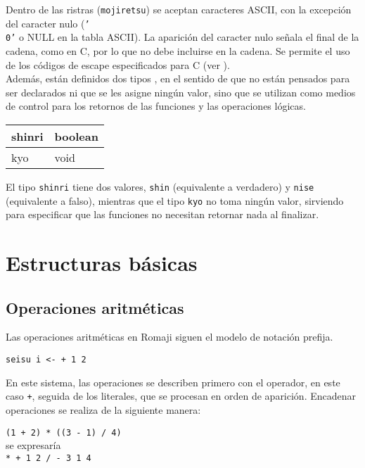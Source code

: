 \documentclass[spanish]{article}
\begin{document}
Dentro de las ristras (\texttt{mojiretsu}) se aceptan caracteres ASCII, con la excepción del caracter nulo (\texttt{'\\0'} o NULL en la tabla ASCII). La aparición del caracter nulo señala el final de la cadena, como en C, por lo que no debe incluirse en la cadena. Se permite el uso de los códigos de escape especificados para C (ver \color{black}).\\

Además, están definidos dos tipos , en el sentido de que no están pensados para ser declarados ni que se les asigne ningún valor, sino que se utilizan como medios de control para los retornos de las funciones y las operaciones lógicas.\\

\begin{center}
  \begin{tabular}{ | l | l | }
    \hline
    shinri      & boolean \\ \hline
    kyo         & void    \\
    \hline
  \end{tabular}
\end{center}
El tipo \texttt{shinri} tiene dos valores, \texttt{shin} (equivalente a verdadero) y \texttt{nise} (equivalente a falso), mientras que el tipo \texttt{kyo} no toma ningún valor, sirviendo para especificar que las funciones no necesitan retornar nada al finalizar.

\section{Estructuras básicas}
\subsection{Operaciones aritméticas}
\label{sec:operaciones-aritmeticas}

Las operaciones aritméticas en Romaji siguen el modelo de notación prefija.\\
\begin{center}
  \texttt{seisu i <- + 1 2}
\end{center}

En este sistema, las operaciones se describen primero con el operador, en este caso \texttt{+}, seguida de los literales, que se procesan en orden de aparición. Encadenar operaciones se realiza de la siguiente manera:
\begin{center}
  \texttt{(1 + 2) * ((3 - 1) / 4)}\\
  se expresaría\\
  \texttt{*  + 1 2  /  - 3 1  4}
\end{center}
\end{document}
